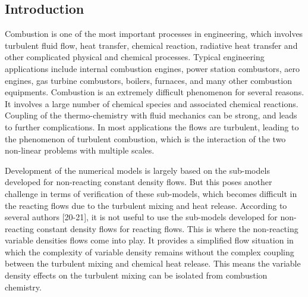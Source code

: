 \documentclass[10pt,a4paper,notitlepage]{article}
\begin{document}
\begin{multicols}{2}
\section{Introduction}
Combustion is one of the most important processes in engineering, which involves turbulent fluid flow, heat transfer, chemical reaction, radiative heat transfer and other complicated physical and chemical processes. Typical engineering applications include internal combustion engines, power station combustors, aero engines, gas turbine combustors, boilers, furnaces, and many other combustion equipments. Combustion is an extremely difficult phenomenon for several reasons. It involves a large number of chemical species and associated chemical reactions. Coupling of the thermo-chemistry with fluid mechanics can be strong, and leads to further complications. In most applications the flows are turbulent, leading to the phenomenon of turbulent combustion, which is the interaction of the two non-linear problems with multiple scales.\par Development of the numerical models is largely based on the sub-models developed for non-reacting constant density flows. But this poses another challenge in terms of verification of these sub-models, which becomes difficult in the reacting flows due to the turbulent mixing and heat release. According to several authors [20-21], it is not useful to use the sub-models developed for non-reacting constant density flows for reacting flows. This is where the non-reacting variable densities flows come into play. It provides a simplified flow situation in which the complexity of variable density remains without the complex coupling between the turbulent mixing and chemical heat release. This means the variable density effects on the turbulent mixing can be isolated from combustion chemistry. 

\end{multicols}
\end{document}
